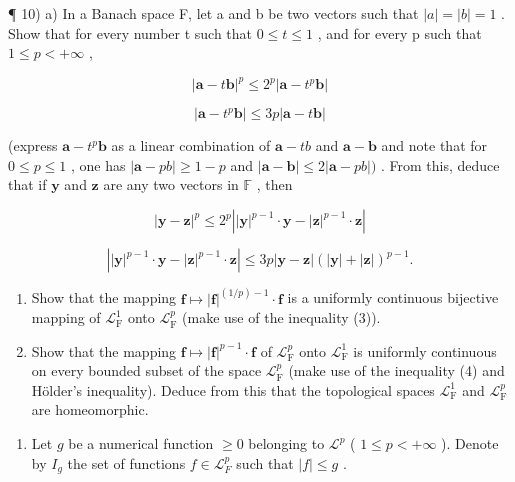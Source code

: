 ¶ 10) a) In a Banach space F, let a and b be two vectors such that \(|a| = |b| = 1\) . Show that for every number t such that \(0 \leqslant t \leqslant 1\) , and for every p such that \(1 \leqslant p < +\infty\) ,

\[
| \mathbf {a} - t \mathbf {b} | ^ {p} \leqslant 2 ^ {p} | \mathbf {a} - t ^ {p} \mathbf {b} |\tag{1}
\]

\[
| \mathbf {a} - t ^ {p} \mathbf {b} | \leqslant 3 p | \mathbf {a} - t \mathbf {b} |\tag{2}
\]

(express \(\mathbf{a} - t^{p}\mathbf{b}\) as a linear combination of \(\mathbf{a} - tb\) and \(\mathbf{a} - \mathbf{b}\) and note that for \(0\leqslant p\leqslant 1\) , one has \(|\mathbf{a} - pb|\geqslant 1 - p\) and \(|\mathbf{a} - \mathbf{b}|\leqslant 2|\mathbf{a} - pb|)\) . From this, deduce that if \(\mathbf{y}\) and \(\mathbf{z}\) are any two vectors in \(\mathbb{F}\) , then

\[
\left| \mathbf {y} - \mathbf {z} \right| ^ {p} \leqslant 2 ^ {p} \left| \left| \mathbf {y} \right| ^ {p - 1} \cdot \mathbf {y} - \left| \mathbf {z} \right| ^ {p - 1} \cdot \mathbf {z} \right|\tag{3}
\]

\[
\left| | \mathbf {y} | ^ {p - 1} \cdot \mathbf {y} - | \mathbf {z} | ^ {p - 1} \cdot \mathbf {z} \right| \leqslant 3 p | \mathbf {y} - \mathbf {z} | (| \mathbf {y} | + | \mathbf {z} |) ^ {p - 1}.\tag{4}
\]

\begin{enumerate}
\def\labelenumi{\alph{enumi})}
\setcounter{enumi}{1}
\item
  Show that the mapping \(\mathbf{f} \mapsto |\mathbf{f}|^{(1/p)-1} \cdot \mathbf{f}\) is a uniformly continuous bijective mapping of \(\mathcal{L}_{\mathrm{F}}^{1}\) onto \(\mathcal{L}_{\mathrm{F}}^{p}\) (make use of the inequality (3)).
\item
  Show that the mapping \(\mathbf{f} \mapsto |\mathbf{f}|^{p-1} \cdot \mathbf{f}\) of \(\mathcal{L}_{\mathrm{F}}^{p}\) onto \(\mathcal{L}_{\mathrm{F}}^{1}\) is uniformly continuous on every bounded subset of the space \(\mathcal{L}_{\mathrm{F}}^{p}\) (make use of the inequality (4) and Hölder's inequality). Deduce from this that the topological spaces \(\mathcal{L}_{\mathrm{F}}^{1}\) and \(\mathcal{L}_{\mathrm{F}}^{p}\) are homeomorphic.
\end{enumerate}

\begin{enumerate}
\def\labelenumi{\arabic{enumi})}
\setcounter{enumi}{10}
\tightlist
\item
  Let \(g\) be a numerical function \(\geqslant 0\) belonging to \(\mathcal{L}^p\) ( \(1 \leqslant p < +\infty\) ). Denote by \(I_g\) the set of functions \(f \in \mathcal{L}_F^p\) such that \(|f| \leqslant g\) .
\end{enumerate}

